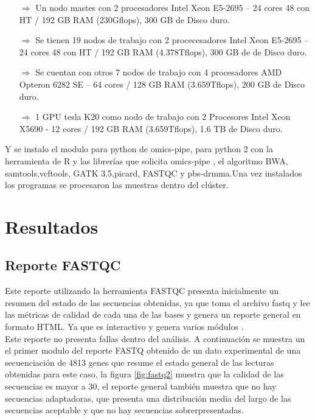 {	\begin{itemize}
		\item[$\Rightarrow$] Un nodo mastes con 2 procesadores Intel Xeon E5-2695 – 24 cores 48 con HT / 192 GB RAM (230Gflops), 300 GB de Disco duro.
		\item[$\Rightarrow$] Se tienen 19 nodos de trabajo con 2 procecesadores  Intel Xeon E5-2695 – 24 cores 48 con HT / 192 GB RAM (4.378Tflops), 300 GB de de Disco duro.
		\item[$\Rightarrow$] Se cuentan con otros 7 nodos de trabajo con 4 procesadores AMD Opteron 6282 SE – 64 cores / 128 GB RAM (3.659Tflops), 200 GB de Disco duro.
		
		\item[$\Rightarrow$] 1 GPU tesla K20 como nodo de trabajo con 2 Procesores  Intel Xeon X5690 - 12 cores / 192 GB RAM (3.659Tflops), 1.6 TB de Disco duro.
		
	\end{itemize}
	
	Y se instalo el modulo para python de omics-pipe, para python 2 con la herramienta de R y las librerías que solicita omics-pipe\cite{Fisch2015} , el algoritmo BWA, samtools,vcftools, GATK 3.5,picard, FASTQC y pbs-drmma.Una vez instalados los programas se procesaron las muestras dentro del clúster.  
	
	\section{Resultados}
	\subsection{Reporte FASTQC}}

Este reporte utilizando la herramienta FASTQC presenta inicialmente un resumen del estado de las secuencias obtenidas, ya que toma el archivo fastq y lee las métricas de calidad de cada una de las bases y genera un reporte general en formato HTML. Ya que es interactivo y genera varios módulos \cite{Babraham2016}. \\

Este reporte no presenta fallas dentro del análisis. A continuación se muestra un el primer modulo del reporte FASTQ obtenido de un dato experimental de una secuenciación de 4813 genes que resume el estado general de las lecturas obtenidas para este caso, la figura \ref{fig:fastq2} muestra que la calidad de las secuencias es mayor a 30, el reporte general también muestra que no hay secuencias adaptadoras, que presenta una distribución media del largo de las secuencias aceptable y que no hay secuencias sobrerpresentadas.  \\

